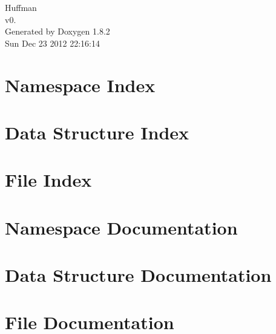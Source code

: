 \documentclass{book}
\begin{document}
\hypersetup{pageanchor=false,citecolor=blue}
\begin{titlepage}
\vspace*{7cm}
\begin{center}
{\Large Huffman \\[1ex]\large v0. }\\
\vspace*{1cm}
{\large Generated by Doxygen 1.8.2}\\
\vspace*{0.5cm}
{\small Sun Dec 23 2012 22:16:14}\\
\end{center}
\end{titlepage}
\clearemptydoublepage
{}
\tableofcontents
\clearemptydoublepage
{}
\hypersetup{pageanchor=true,citecolor=blue}
\chapter{Namespace Index}

\chapter{Data Structure Index}

\chapter{File Index}

\chapter{Namespace Documentation}


\chapter{Data Structure Documentation}




\chapter{File Documentation}













\printindex
\end{document}
